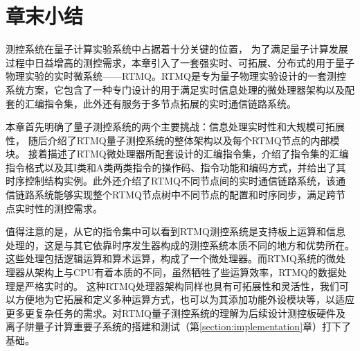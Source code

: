 




\newpage
\section[章末小结]{章末小结}

测控系统在量子计算实验系统中占据着十分关键的位置，
为了满足量子计算发展过程中日益增高的测控需求，本章引入了一套强实时、可拓展、分布式的用于量子物理实验的实时微系统——RTMQ。RTMQ是专为量子物理实验设计的一套测控系统方案，它包含了一种专门设计的用于满足实时信息处理的微处理器架构以及配套的汇编指令集，此外还有服务于多节点拓展的实时通信链路系统。

本章首先明确了量子测控系统的两个主要挑战：信息处理实时性和大规模可拓展性，
随后介绍了RTMQ量子测控系统的整体架构以及每个RTMQ节点的内部模块。
接着描述了RTMQ微处理器所配套设计的汇编指令集，介绍了指令集的汇编指令格式以及其I类和A类两类指令的操作码、指令功能和编码方式，并给出了其时序控制结构实例。此外还介绍了RTMQ不同节点间的实时通信链路系统，该通信链路系统能够实现整个RTMQ节点树中不同节点的配置和时序同步，满足跨节点实时性的测控需求。

值得注意的是，从它的指令集中可以看到RTMQ测控系统是支持板上运算和信息处理的，这是与其它依靠时序发生器构成的测控系统本质不同的地方和优势所在。这些处理包括逻辑运算和算术运算，构成了一个微处理器。而RTMQ系统的微处理器从架构上与CPU有着本质的不同，虽然牺牲了些运算效率，RTMQ的数据处理是严格实时的。
这种RTMQ处理器架构同样也具有可拓展性和灵活性，我们可以方便地为它拓展和定义多种运算方式，也可以为其添加功能外设模块等，以适应更多更复杂任务的需求。对RTMQ量子测控系统的理解为后续设计测控板硬件及离子阱量子计算重要子系统的搭建和测试（第\ref{section:implementation}章）打下了基础。
